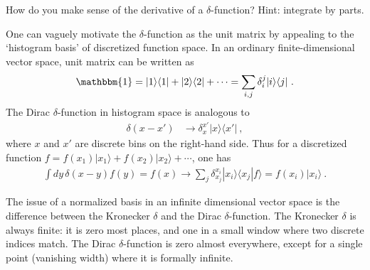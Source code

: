  \begin{exercise}
 How do you make sense of the derivative of a $\delta$-function? Hint: integrate by parts. 
 \end{exercise}
 



\begin{example}
One can vaguely motivate the $\delta$-function as the unit matrix by appealing to the `histogram basis' of discretized function space. In an ordinary finite-dimensional vector space, unit matrix can be written as
\begin{align}
  \mathbbm{1} = |1\rangle\langle 1 | + |2\rangle\langle 2 | + \cdots
  = \sum_{i,j}\delta_{i}^j|i\rangle\langle j| \ .
\end{align}
The Dirac $\delta$-function in histogram space is analogous to
\begin{align}
  \delta(x-x') &\to \delta_{x}^{x'}|x\rangle\langle x'| \ ,
\end{align}
where $x$ and $x'$ are discrete bins on the right-hand side. Thus for a discretized function $f = f(x_1)|x_1\rangle + f(x_2)|x_2\rangle + \cdots$, one has
\begin{align}
  \int dy\, \delta(x-y) f(y) = f(x) \longrightarrow \sum_j \delta_{x_j}^{x_i}|x_i\rangle\langle x_j| f\rangle  =  f(x_i) |x_i\rangle\ .
\end{align}
\end{example}




\begin{bigidea}
The issue of a normalized basis in an infinite dimensional vector space is the difference between the Kronecker $\delta$ and the Dirac $\delta$-function. The Kronecker $\delta$ is always finite: it is zero most places, and one in a small window where two discrete indices match. The Dirac $\delta$-function is zero almost everywhere, except for a single point (vanishing width) where it is formally infinite.
\end{bigidea}















